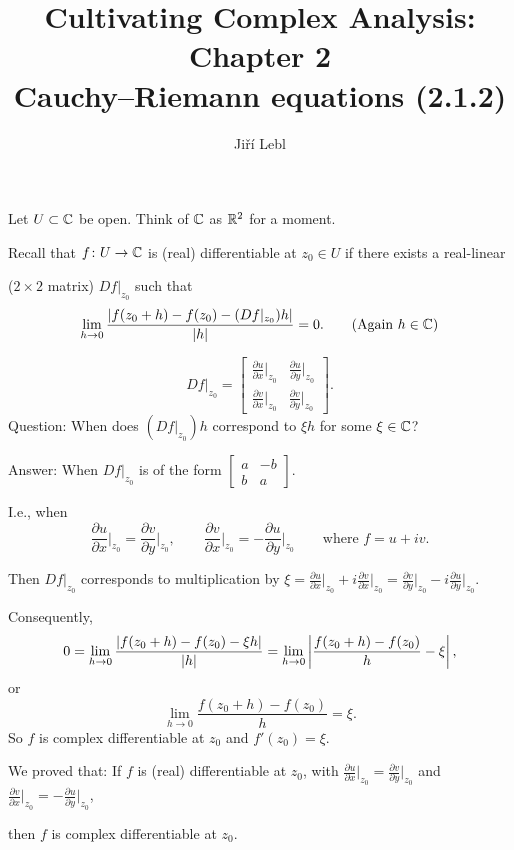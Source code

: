 \documentclass[10pt,aspectratio=169]{beamer}
\author{Ji\v{r}\'i Lebl}
\institute[OSU]{%
Departemento pri Matematiko de Oklahoma {\^S}tata Universitato}
\title{Cultivating Complex Analysis: Chapter 2\\%
Cauchy--Riemann equations (2.1.2)}
\date{}
\begin{document}
\begin{frame}
\titlepage
\end{frame}

\begin{frame}
Let $U \subset {\mathbb{C}}$ be open.  Think of ${\mathbb{C}}$ as ${\mathbb{R}}^2$ for a moment.

\pause
\medskip

Recall that $f \colon U \to {\mathbb{C}}$ is (real) differentiable at $z_0 \in U$ if
there exists a real-linear

($2\times 2$ matrix) $Df|_{z_0}$ such that
\[
\lim_{h \to 0} \frac{\lvert {f(z_0+h) - f(z_0) - (Df|_{z_0}) h} \rvert}{\lvert {h} \rvert} = 0 .
\qquad \text{(Again $h\in {\mathbb{C}}$)}
\]

\pause

\[
Df|_{z_0} =
\begin{bmatrix}
\frac{\partial u}{\partial x}\big|_{z_0} & \frac{\partial u}{\partial
y}\big|_{z_0} \\[5pt]
\frac{\partial v}{\partial x}\big|_{z_0} & \frac{\partial v}{\partial y}\big|_{z_0}
\end{bmatrix} .
\]
\pause
Question: When does $(Df|_{z_0})h$ correspond to $\xi h$ for some $\xi \in {\mathbb{C}}$?

\medskip
\pause

Answer: When $Df|_{z_0}$ is of the form
$\left[ \begin{smallmatrix}
a & -b \\ b & a
\end{smallmatrix} \right]$.

\medskip
\pause

I.e., when
\[
\frac{\partial u}{\partial x}\Big|_{z_0} =
\frac{\partial v}{\partial y}\Big|_{z_0}
, \qquad
\frac{\partial v}{\partial x}\Big|_{z_0} =
-\frac{\partial u}{\partial y}\Big|_{z_0}
\qquad \text{where }
f= u + iv. 
\]

\pause
Then
$Df|_{z_0}$ corresponds to multiplication by 
$\xi = \frac{\partial u}{\partial x}\big|_{z_0} + i \frac{\partial v}{\partial
x}\big|_{z_0} = \frac{\partial v}{\partial y}\big|_{z_0} - i \frac{\partial u}{\partial
y}\big|_{z_0}$.

\end{frame}

\begin{frame}
Consequently,
\begin{equation*}
0 = \lim_{h \to 0} \frac{\lvert {f(z_0+h) - f(z_0) - \xi h} \rvert}{\lvert {h} \rvert} =
\lim_{h \to 0} \left\lvert {\frac{f(z_0+h) - f(z_0)}{h} - \xi} \right\rvert ,
\end{equation*}
\pause
or
\begin{equation*}
\lim_{h \to 0} \frac{f(z_0+h) - f(z_0)}{h} = \xi .
\end{equation*}
\pause
So $f$ is complex differentiable at $z_0$ and $f'(z_0) = \xi$.

\medskip
\pause

We proved that: If $f$ is (real) differentiable at $z_0$, with
$\frac{\partial u}{\partial x}\big|_{z_0} = \frac{\partial v}{\partial
y}\big|_{z_0}$ and $\frac{\partial v}{\partial x}\big|_{z_0} = -\frac{\partial
u}{\partial y}\big|_{z_0}$,

then $f$ is complex differentiable at $z_0$.

\end{frame}
\end{document}
